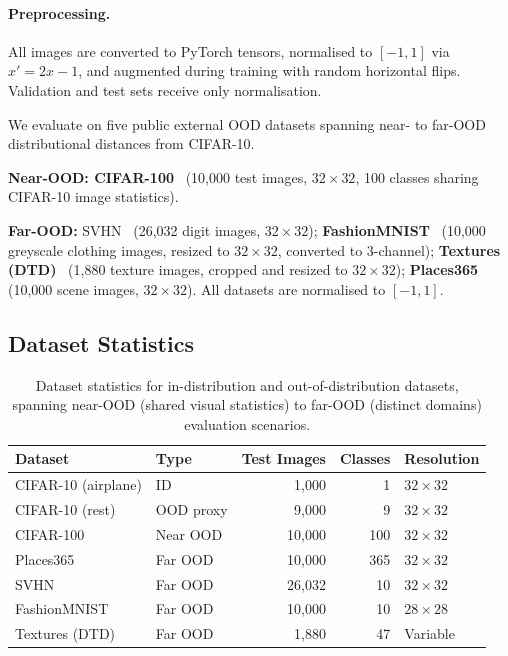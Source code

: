 \paragraph{Preprocessing.}
All images are converted to PyTorch tensors, normalised to $[-1, 1]$ via
$x' = 2x - 1$, and augmented during training with random horizontal
flips. Validation and test sets receive only normalisation.

We evaluate on five public external OOD datasets spanning near- to far-OOD
distributional distances from CIFAR-10.

\textbf{Near-OOD: CIFAR-100}~\citep{krizhevsky2009learning} (10,000 test images,
$32 \times 32$, 100 classes sharing CIFAR-10 image statistics).

\textbf{Far-OOD:} SVHN~\citep{netzer2011reading} (26,032 digit images,
$32 \times 32$); \textbf{FashionMNIST}~\citep{xiao2017fashion} (10,000 greyscale
clothing images, resized to $32 \times 32$, converted to 3-channel);
\textbf{Textures (DTD)}~\citep{cimpoi2014describing} (1,880 texture images,
cropped and resized to $32 \times 32$);
\textbf{Places365}~\citep{zhou2018places} (10,000 scene images,
$32 \times 32$). All datasets are normalised to $[-1, 1]$.

\subsection{Dataset Statistics}
\label{sec:exp:datasets:statistics}

\begin{table}[htbp]
  \centering
  \caption{Dataset statistics for in-distribution and
    out-of-distribution datasets, spanning near-OOD (shared visual
    statistics) to far-OOD (distinct domains) evaluation scenarios.}
  \label{tab:exp:dataset-statistics}
  \begin{tabular}{llrrl}
    \toprule
    Dataset & Type & Test Images & Classes & Resolution \\
    \midrule
    CIFAR-10 (airplane) & ID          &  1,000 &   1 & $32 \times 32$  \\
    CIFAR-10 (rest)     & OOD proxy   &  9,000 &   9 & $32 \times 32$  \\
    CIFAR-100           & Near OOD    & 10,000 & 100 & $32 \times 32$  \\
    Places365           & Far OOD     & 10,000 & 365 & $32 \times 32$  \\
    SVHN                & Far OOD     & 26,032 &  10 & $32 \times 32$  \\
    FashionMNIST        & Far OOD     & 10,000 &  10 & $28 \times 28$  \\
    Textures (DTD)      & Far OOD     &  1,880 &  47 & Variable        \\
    \bottomrule
  \end{tabular}
\end{table}

